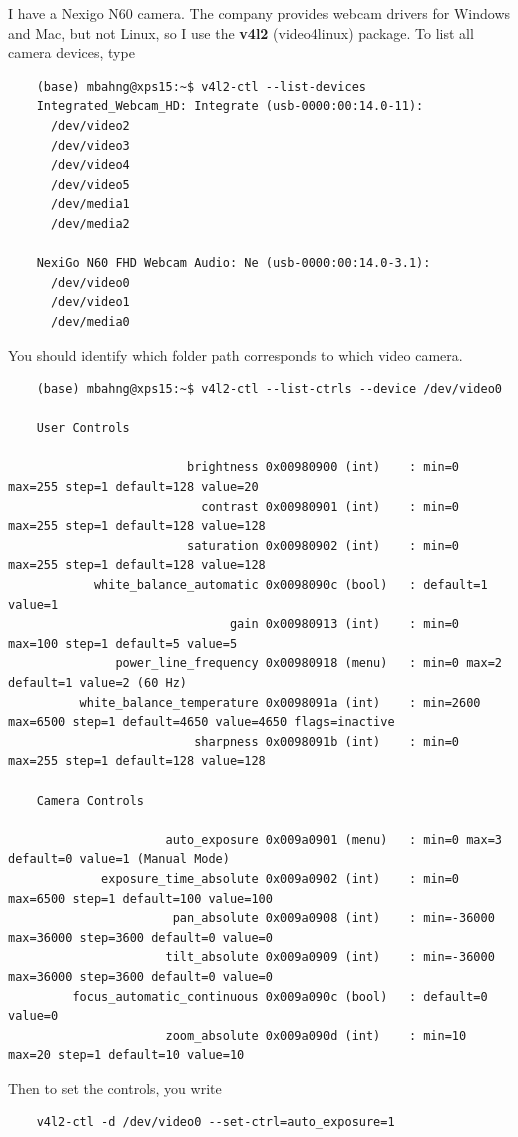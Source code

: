 \documentclass{article}
\begin{document}
    I have a Nexigo N60 camera. The company provides webcam drivers for Windows and Mac, but not Linux, so I use the \textbf{v4l2} (video4linux) package. To list all camera devices, type 
    \begin{lstlisting}
    (base) mbahng@xps15:~$ v4l2-ctl --list-devices
    Integrated_Webcam_HD: Integrate (usb-0000:00:14.0-11):
      /dev/video2
      /dev/video3
      /dev/video4
      /dev/video5
      /dev/media1
      /dev/media2

    NexiGo N60 FHD Webcam Audio: Ne (usb-0000:00:14.0-3.1):
      /dev/video0
      /dev/video1
      /dev/media0
    \end{lstlisting}
    You should identify which folder path corresponds to which video camera. 
    \begin{lstlisting}
    (base) mbahng@xps15:~$ v4l2-ctl --list-ctrls --device /dev/video0

    User Controls

                         brightness 0x00980900 (int)    : min=0 max=255 step=1 default=128 value=20
                           contrast 0x00980901 (int)    : min=0 max=255 step=1 default=128 value=128
                         saturation 0x00980902 (int)    : min=0 max=255 step=1 default=128 value=128
            white_balance_automatic 0x0098090c (bool)   : default=1 value=1
                               gain 0x00980913 (int)    : min=0 max=100 step=1 default=5 value=5
               power_line_frequency 0x00980918 (menu)   : min=0 max=2 default=1 value=2 (60 Hz)
          white_balance_temperature 0x0098091a (int)    : min=2600 max=6500 step=1 default=4650 value=4650 flags=inactive
                          sharpness 0x0098091b (int)    : min=0 max=255 step=1 default=128 value=128

    Camera Controls

                      auto_exposure 0x009a0901 (menu)   : min=0 max=3 default=0 value=1 (Manual Mode)
             exposure_time_absolute 0x009a0902 (int)    : min=0 max=6500 step=1 default=100 value=100
                       pan_absolute 0x009a0908 (int)    : min=-36000 max=36000 step=3600 default=0 value=0
                      tilt_absolute 0x009a0909 (int)    : min=-36000 max=36000 step=3600 default=0 value=0
         focus_automatic_continuous 0x009a090c (bool)   : default=0 value=0
                      zoom_absolute 0x009a090d (int)    : min=10 max=20 step=1 default=10 value=10

    \end{lstlisting}
    Then to set the controls, you write 
    \begin{lstlisting}
    v4l2-ctl -d /dev/video0 --set-ctrl=auto_exposure=1
    \end{lstlisting}
\end{document}
